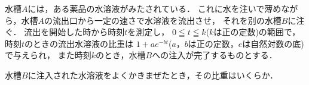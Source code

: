 \documentclass[../../main.tex]{subfiles}
\begin{document}
水槽$A$には，ある薬品の水溶液がみたされている．
これに水を注いで薄めながら，水槽$A$の流出口から一定の速さで水溶液を流出させ，
それを別の水槽$B$に注ぐ．
流出を開始した時から時刻$t$を測定し，
$0 \leqq t \leqq k$($k$は正の定数)の範囲で，時刻$t$のときの流出水溶液の比重は
$1+ae^{-bt}$($a$，$b$は正の定数，$e$は自然対数の底)で与えられ，
また時刻$k$のとき，水槽$B$への注入が完了するものとする．

水槽$B$に注入された水溶液をよくかきまぜたとき，その比重はいくらか．
\end{document}

